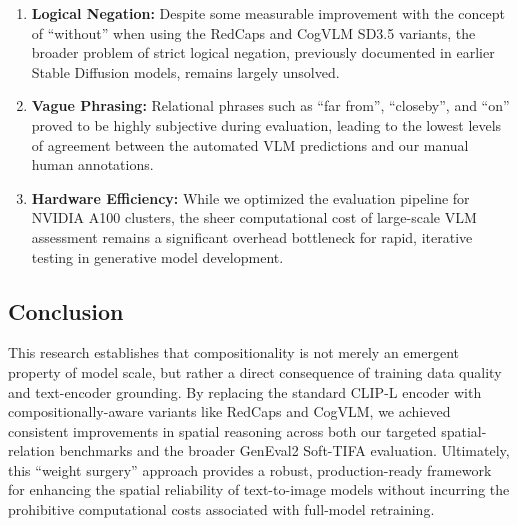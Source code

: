 \begin{enumerate}
    \item \textbf{Logical Negation:} Despite some measurable improvement with the concept of ``without'' when using the RedCaps and CogVLM SD3.5 variants, the broader problem of strict logical negation, previously documented in earlier Stable Diffusion models, remains largely unsolved.
    \item \textbf{Vague Phrasing:} Relational phrases such as ``far from'', ``closeby'', and ``on'' proved to be highly subjective during evaluation, leading to the lowest levels of agreement between the automated VLM predictions and our manual human annotations.
    \item \textbf{Hardware Efficiency:} While we optimized the evaluation pipeline for NVIDIA A100 clusters, the sheer computational cost of large-scale VLM assessment remains a significant overhead bottleneck for rapid, iterative testing in generative model development.
\end{enumerate}

\subsection{Conclusion}
This research establishes that compositionality is not merely an emergent property of model scale, but rather a direct consequence of training data quality and text-encoder grounding. By replacing the standard CLIP-L encoder with compositionally-aware variants like RedCaps and CogVLM, we achieved consistent improvements in spatial reasoning across both our targeted spatial-relation benchmarks and the broader GenEval2 Soft-TIFA evaluation. Ultimately, this ``weight surgery'' approach provides a robust, production-ready framework for enhancing the spatial reliability of text-to-image models without incurring the prohibitive computational costs associated with full-model retraining.